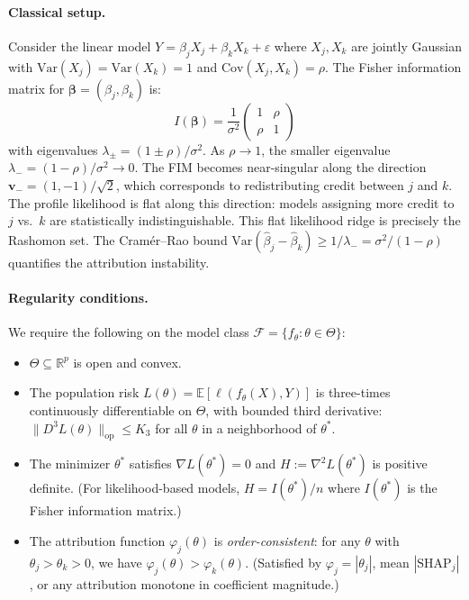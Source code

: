 \documentclass{article}
\newcommand{\R}{\mathbb{R}}
\newcommand{\E}{\mathbb{E}}
\newcommand{\Var}{\mathrm{Var}}
\begin{document}
\paragraph{Classical setup.}
Consider the linear model $Y = \beta_j X_j + \beta_k X_k + \varepsilon$ where $X_j, X_k$ are jointly Gaussian with $\Var(X_j) = \Var(X_k) = 1$ and $\text{Cov}(X_j, X_k) = \rho$. The Fisher information matrix for $\boldsymbol{\beta} = (\beta_j, \beta_k)$ is:
\[
    I(\boldsymbol{\beta}) = \frac{1}{\sigma^2}\begin{pmatrix} 1 & \rho \\ \rho & 1 \end{pmatrix}
\]
with eigenvalues $\lambda_\pm = (1 \pm \rho)/\sigma^2$. As $\rho \to 1$, the smaller eigenvalue $\lambda_- = (1-\rho)/\sigma^2 \to 0$. The FIM becomes near-singular along the direction $\boldsymbol{v}_- = (1, -1)/\sqrt{2}$, which corresponds to redistributing credit between $j$ and $k$. The profile likelihood is flat along this direction: models assigning more credit to $j$ vs.\ $k$ are statistically indistinguishable. This flat likelihood ridge is precisely the Rashomon set. The Cram\'er--Rao bound $\Var(\hat\beta_j - \hat\beta_k) \geq 1/\lambda_- = \sigma^2/(1-\rho)$ quantifies the attribution instability.

\paragraph{Regularity conditions.}
We require the following on the model class $\mathcal{F} = \{f_\theta : \theta \in \Theta\}$:
\begin{itemize}
    \item[\textbf{(R1)}] $\Theta \subseteq \R^p$ is open and convex.
    \item[\textbf{(R2)}] The population risk $L(\theta) = \E[\ell(f_\theta(X), Y)]$ is three-times continuously differentiable on $\Theta$, with bounded third derivative: $\|D^3 L(\theta)\|_{\text{op}} \leq K_3$ for all $\theta$ in a neighborhood of $\theta^*$.
    \item[\textbf{(R3)}] The minimizer $\theta^*$ satisfies $\nabla L(\theta^*) = 0$ and $H := \nabla^2 L(\theta^*)$ is positive definite. (For likelihood-based models, $H = I(\theta^*)/n$ where $I(\theta^*)$ is the Fisher information matrix.)
    \item[\textbf{(R4)}] The attribution function $\varphi_j(\theta)$ is \emph{order-consistent}: for any $\theta$ with $\theta_j > \theta_k > 0$, we have $\varphi_j(\theta) > \varphi_k(\theta)$. (Satisfied by $\varphi_j = |\theta_j|$, mean $|\text{SHAP}_j|$, or any attribution monotone in coefficient magnitude.)
\end{itemize}
\end{document}
